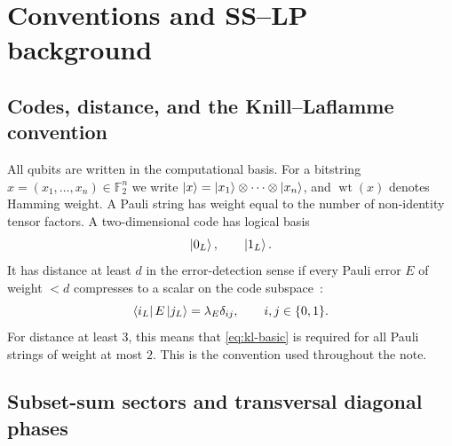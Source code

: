 \documentclass[11pt]{article}
\newcommand{\F}{\mathbb F}
\newcommand{\wt}{\operatorname{wt}}
\begin{document}
\tableofcontents

\section{Conventions and SS--LP background}
\label{sec:sslp-background}

\subsection{Codes, distance, and the Knill--Laflamme convention}

All qubits are written in the computational basis.  For a bitstring
$x=(x_1,\ldots,x_n)\in\F_2^n$ we write $\ket{x}=\ket{x_1}\otimes\cdots\otimes\ket{x_n}$,
and $\wt(x)$ denotes Hamming weight.  A Pauli string has weight equal to the number of
non-identity tensor factors.  A two-dimensional code has logical basis
\[
  \ket{0_L},\qquad \ket{1_L}.
\]
It has distance at least $d$ in the error-detection sense if every Pauli error $E$ of weight
$<d$ compresses to a scalar on the code subspace~\cite{KnillLaflamme1997}:
\begin{equation}
  \bra{i_L}E\ket{j_L}=\lambda_E\delta_{ij},
  \qquad i,j\in\{0,1\}.
  \label{eq:kl-basic}
\end{equation}
For distance at least $3$, this means that \eqref{eq:kl-basic} is required for all Pauli strings
of weight at most $2$.  This is the convention used throughout the note.

\subsection{Subset-sum sectors and transversal diagonal phases}
\end{document}
